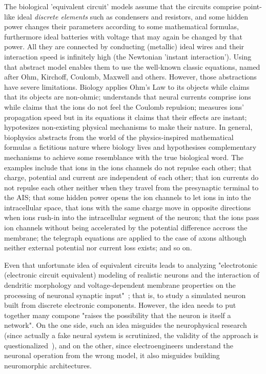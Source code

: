 The biological 'equivalent circuit' models assume that the circuits comprise point-like
ideal \textit{discrete elements}
such as condensers and resistors, and some hidden power changes their parameters according to some
mathematical formulas,
furthermore ideal batteries with voltage that may again be changed  by that power.
All they are connected by conducting  (metallic) ideal wires
and their interaction speed is infinitely high (the Newtonian 'instant interaction').
Using that abstract model enables them to use the well-known classic equations, named after
Ohm, Kirchoff, Coulomb, Maxwell and others. However, those abstractions have severe limitations.
Biology applies Ohm's Law to its objects while claims that its objects are non-ohmic;
understands that neural currents comprise ions while claims that the ions do not feel the Coulomb repulsion;
measures ions' propagation speed but in its equations it claims that their effects are instant;
hypotesizes non-existing physical mechanisms to make their nature. In general,
biophysics abstracts from the world of the physics-inspired mathematical formulas a fictitious nature
where biology lives and hypothesises complementary mechanisms to achieve some resemblance with the true biological word.
The examples include that ions in the ions channels do not repulse each other;
that charge, potential and current are independent of each other;
that ion currents do not repulse each other neither when they travel from the presynaptic terminal to the
\gls{AIS};
that some hidden power opens the ion channels to let ions in into the intracellular space,
that ions with the same charge move in opposite directions when ions rush-in into the intracellular segment of the neuron;
that the ions pass ion channels without being accelerated by the potential difference accross the membrane;
the telegraph equations are applied to the case of axons although neither external potential nor current loss exists; and so on.


Even that unfortunate idea of equivalent circuits leads to analyzing
"electrotonic (electronic circuit equivalent) modeling of realistic neurons and the interaction of dendritic morphology
and voltage-dependent membrane properties on the processing of neuronal synaptic input"~\cite{SingleNeuronComputation:2014};
that is, to study a simulated neuron built from discrete electronic components. However, the idea needs to put together
many compone "raises the possibility that the neuron is itself a network". On the one side, such an idea misguides the neurophysical research (since actually a fake neural system is scrutinized, the validity of the approach is questionalized~\cite{RealisticNeuronalModeling:2016}), and on the other, since electroengineers understand
the neuronal operation from the wrong model, it also misguides building neuromorphic architectures. 

